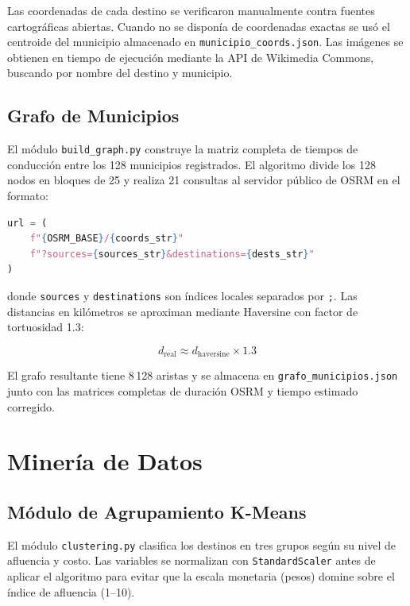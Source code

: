 \documentclass[12pt,letterpaper]{report}
\begin{document}
Las coordenadas de cada destino se verificaron manualmente contra fuentes cartográficas abiertas.
Cuando no se disponía de coordenadas exactas se usó el centroide del municipio almacenado en
\texttt{municipio\_coords.json}. Las imágenes se obtienen en tiempo de ejecución mediante
la API de Wikimedia Commons, buscando por nombre del destino y municipio.

\subsection{Grafo de Municipios}

El módulo \texttt{build\_graph.py} construye la matriz completa de tiempos de conducción entre
los 128 municipios registrados. El algoritmo divide los 128 nodos en bloques de 25 y realiza
21 consultas al servidor público de OSRM en el formato:

\begin{lstlisting}[language=Python, caption=Consulta al endpoint /table de OSRM]
url = (
    f"{OSRM_BASE}/{coords_str}"
    f"?sources={sources_str}&destinations={dests_str}"
)
\end{lstlisting}

donde \texttt{sources} y \texttt{destinations} son índices locales separados por \texttt{;}.
Las distancias en kilómetros se aproximan mediante Haversine con factor de tortuosidad 1.3:

\begin{equation}
  d_{\text{real}} \approx d_{\text{haversine}} \times 1.3
  \label{eq:haversine}
\end{equation}

El grafo resultante tiene 8\,128 aristas y se almacena en \texttt{grafo\_municipios.json}
junto con las matrices completas de duración OSRM y tiempo estimado corregido.

\section{Minería de Datos}

\subsection{Módulo de Agrupamiento K-Means}

El módulo \texttt{clustering.py} clasifica los destinos en tres grupos según su nivel de
afluencia y costo. Las variables se normalizan con \texttt{StandardScaler} antes de aplicar
el algoritmo para evitar que la escala monetaria (pesos) domine sobre el índice de afluencia
(1–10).
\end{document}
